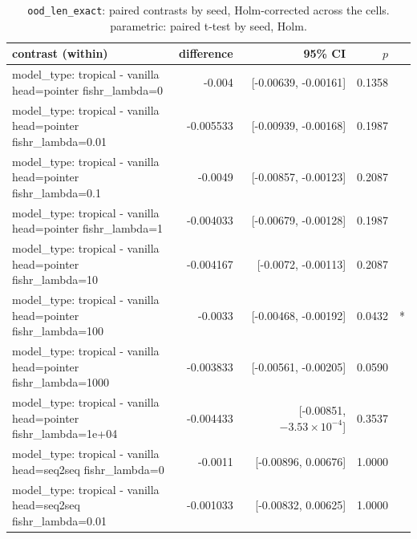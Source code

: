 \documentclass[10pt]{article}
\makeatletter
\newcommand{\stackcell}[1]{\begin{tabular}[t]{@{}l@{}}#1\end{tabular}}
\makeatother
\begin{document}
{\small
\begin{longtable}{lrrrl}
\caption{\texttt{ood\_len\_exact}: paired contrasts by seed, Holm-corrected across the cells. parametric: paired t-test by seed, Holm.}\label{tab:paired-ood_len_exact}\\
\toprule
contrast (within) & difference & 95\% CI & $p$ & \\
\midrule
\endhead
\stackcell{model\_type: tropical - vanilla\\\footnotesize head=pointer fishr\_lambda=0 } & -0.004 & [-0.00639, -0.00161] & 0.1358 & \\
\stackcell{model\_type: tropical - vanilla\\\footnotesize head=pointer fishr\_lambda=0.01 } & -0.005533 & [-0.00939, -0.00168] & 0.1987 & \\
\stackcell{model\_type: tropical - vanilla\\\footnotesize head=pointer fishr\_lambda=0.1 } & -0.0049 & [-0.00857, -0.00123] & 0.2087 & \\
\stackcell{model\_type: tropical - vanilla\\\footnotesize head=pointer fishr\_lambda=1 } & -0.004033 & [-0.00679, -0.00128] & 0.1987 & \\
\stackcell{model\_type: tropical - vanilla\\\footnotesize head=pointer fishr\_lambda=10 } & -0.004167 & [-0.0072, -0.00113] & 0.2087 & \\
\stackcell{model\_type: tropical - vanilla\\\footnotesize head=pointer fishr\_lambda=100 } & -0.0033 & [-0.00468, -0.00192] & 0.0432 & *\\
\stackcell{model\_type: tropical - vanilla\\\footnotesize head=pointer fishr\_lambda=1000 } & -0.003833 & [-0.00561, -0.00205] & 0.0590 & \\
\stackcell{model\_type: tropical - vanilla\\\footnotesize head=pointer fishr\_lambda=1e+04 } & -0.004433 & [-0.00851, $-3.53\times10^{-4}$] & 0.3537 & \\
\stackcell{model\_type: tropical - vanilla\\\footnotesize head=seq2seq fishr\_lambda=0 } & -0.0011 & [-0.00896, 0.00676] & 1.0000 & \\
\stackcell{model\_type: tropical - vanilla\\\footnotesize head=seq2seq fishr\_lambda=0.01 } & -0.001033 & [-0.00832, 0.00625] & 1.0000 & \\

\end{longtable}}
\end{document}
